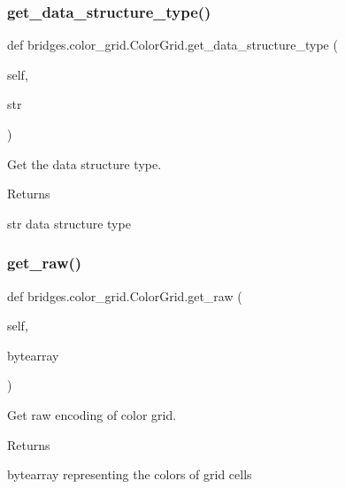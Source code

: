 \subsubsection{\texorpdfstring{get\+\_\+data\+\_\+structure\+\_\+type()}{get\_data\_structure\_type()}}
{\footnotesize\ttfamily def bridges.\+color\+\_\+grid.\+Color\+Grid.\+get\+\_\+data\+\_\+structure\+\_\+type (\begin{DoxyParamCaption}\item[{}]{self,  }\item[{}]{str }\end{DoxyParamCaption})}



Get the data structure type. 

\begin{DoxyReturn}{Returns}


str data structure type 
\end{DoxyReturn}
\mbox{\label{classbridges_1_1color__grid_1_1_color_grid_ab6685633fe237eb118cf2db2f624cd60}} 
\subsubsection{\texorpdfstring{get\+\_\+raw()}{get\_raw()}}
{\footnotesize\ttfamily def bridges.\+color\+\_\+grid.\+Color\+Grid.\+get\+\_\+raw (\begin{DoxyParamCaption}\item[{}]{self,  }\item[{}]{bytearray }\end{DoxyParamCaption})}



Get raw encoding of color grid. 

\begin{DoxyReturn}{Returns}


bytearray representing the colors of grid cells 
\end{DoxyReturn}
\mbox{\label{classbridges_1_1color__grid_1_1_color_grid_a48ded4391e60e4f42213fb3711730614}} 
